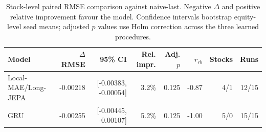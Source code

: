 \begin{table}[t]
\centering
\small
\caption{Stock-level paired RMSE comparison against naive-last. Negative $\Delta$ and positive relative improvement favour the model. Confidence intervals bootstrap equity-level seed means; adjusted $p$ values use Holm correction across the three learned procedures.}
\label{tab:paired_rmse_naive}
\begin{tabular}{lrrrrrrr}
\toprule
Model & $\Delta$RMSE & 95\% CI & Rel. impr. & Adj. $p$ & $r_{rb}$ & Stocks & Runs \\
\midrule
Local-MAE/Long-JEPA & -0.00218 & [-0.00383, -0.00054] & 3.2\% & 0.125 & -0.87 & 4/1 & 12/15 \\
GRU & -0.00255 & [-0.00445, -0.00107] & 5.2\% & 0.125 & -1.00 & 5/0 & 15/15 \\
\bottomrule
\end{tabular}
\end{table}
